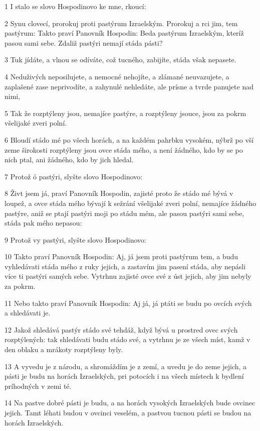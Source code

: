 \par 1 I stalo se slovo Hospodinovo ke mne, rkoucí:
\par 2 Synu clovecí, prorokuj proti pastýrum Izraelským. Prorokuj a rci jim, tem pastýrum: Takto praví Panovník Hospodin: Beda pastýrum Izraelským, kteríž pasou sami sebe. Zdaliž pastýri nemají stáda pásti?
\par 3 Tuk jídáte, a vlnou se odíváte, což tucného, zabijíte, stáda však nepasete.
\par 4 Neduživých neposilujete, a nemocné nehojíte, a zlámané neuvazujete, a zaplašené zase neprivodíte, a zahynulé nehledáte, ale prísne a tvrde panujete nad nimi,
\par 5 Tak že rozptýleny jsou, nemajíce pastýre, a rozptýleny jsouce, jsou za pokrm všelijaké zveri polní.
\par 6 Bloudí stádo mé po všech horách, a na každém pahrbku vysokém, nýbrž po vší zeme širokosti rozptýleny jsou ovce stáda mého, a není žádného, kdo by se po nich ptal, ani žádného, kdo by jich hledal.
\par 7 Protož ó pastýri, slyšte slovo Hospodinovo:
\par 8 Živt jsem já, praví Panovník Hospodin, zajisté proto že stádo mé bývá v loupež, a ovce stáda mého bývají k sežrání všelijaké zveri polní, nemajíce žádného pastýre, aniž se ptají pastýri moji po stádu mém, ale pasou pastýri sami sebe, stáda pak mého nepasou:
\par 9 Protož vy pastýri, slyšte slovo Hospodinovo:
\par 10 Takto praví Panovník Hospodin: Aj, já jsem proti pastýrum tem, a budu vyhledávati stáda mého z ruky jejich, a zastavím jim pasení stáda, aby nepásli více ti pastýri samých sebe. Vytrhnu zajisté ovce své z úst jejich, aby jim nebyly za pokrm.
\par 11 Nebo takto praví Panovník Hospodin: Aj já, já ptáti se budu po ovcích svých a shledávati je.
\par 12 Jakož shledává pastýr stádo své tehdáž, když bývá u prostred ovec svých rozptýlených: tak shledávati budu stádo své, a vytrhnu je ze všech míst, kamž v den oblaku a mrákoty rozptýleny byly.
\par 13 A vyvedu je z národu, a shromáždím je z zemí, a uvedu je do zeme jejich, a pásti je budu na horách Izraelských, pri potocích i na všech místech k bydlení príhodných v zemi té.
\par 14 Na pastve dobré pásti je budu, a na horách vysokých Izraelských bude ovcinec jejich. Tamt léhati budou v ovcinci veselém, a pastvou tucnou pásti se budou na horách Izraelských.
